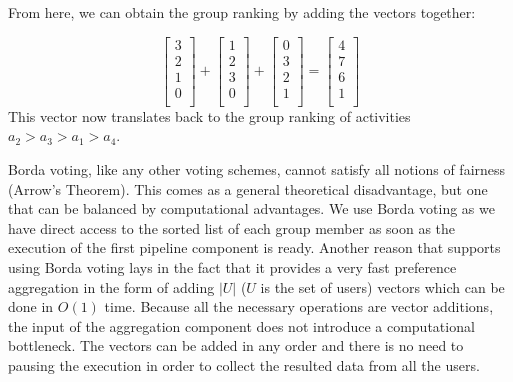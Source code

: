 \documentclass[11pt,a4paper,oneside]{article}
\begin{document}
From here, we can obtain the group ranking by adding the vectors together:

\begin{equation}
    \begin{bmatrix}
    3 \\
    2 \\
    1 \\
    0 \\
    \end{bmatrix} + 
    \begin{bmatrix}
    1 \\
    2 \\
    3 \\
    0 \\
    \end{bmatrix} + 
    \begin{bmatrix}
    0 \\
    3 \\
    2 \\
    1 \\
    \end{bmatrix} = 
    \begin{bmatrix}
    4 \\
    7 \\
    6 \\
    1 \\
    \end{bmatrix}
\end{equation}
This vector now translates back to the group ranking of activities $a_2 > a_3 > a_1 > a_4$.

Borda voting, like any other voting schemes, cannot satisfy all notions of fairness (Arrow's Theorem).\cite[pp. 260]{shohamMultiagentSystemsAlgorithmic} This comes as a general theoretical disadvantage, but one that can be balanced by computational advantages. We use Borda voting as we have direct access to the sorted list of each group member as soon as the execution of the first pipeline component is ready. Another reason that supports using Borda voting lays in the fact that it provides a very fast preference aggregation in the form of adding $|U|$ ($U$ is the set of users) vectors which can be done in $O(1)$ time. Because all the necessary operations are vector additions, the input of the aggregation component does not introduce a computational bottleneck. The vectors can be added in any order and there is no need to pausing the execution in order to collect the resulted data from all the users.
\end{document}
